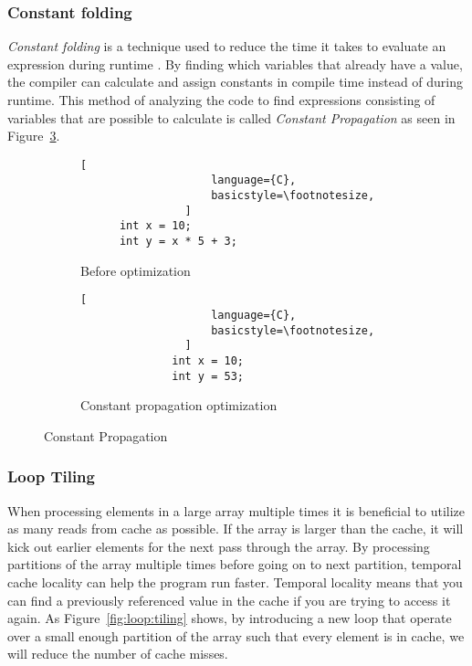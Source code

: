 \subsubsection{Constant folding}
\emph{Constant folding} is a technique used to reduce the time it takes to evaluate an expression during runtime \cite[p.~329]{muchnick1997advanced}. By finding which variables that already have a value, the compiler can calculate and assign constants in compile time instead of during runtime. This method of analyzing the code to find expressions consisting of variables that are possible to calculate is called \emph{Constant Propagation} as seen in Figure~\ref{fig:constant:propagation}.

\ifrelease
\begin{figure}[h]
    \centering
    \begin{adjustbox}{minipage=\linewidth,scale=1.0}
        \begin{subfigure}{.40\textwidth}
            \centering
            \begin{lstlisting}[
                    language={C},
                    basicstyle=\footnotesize,
                ]
      int x = 10;
      int y = x * 5 + 3;
                \end{lstlisting}
            \caption{Before optimization}
            \label{fig:propagation:sub1}
        \end{subfigure}%
        \begin{subfigure}{.50\textwidth}
            \centering
            \begin{lstlisting}[
                    language={C},
                    basicstyle=\footnotesize,
                ]
              int x = 10;
              int y = 53;
                \end{lstlisting}
            \caption{Constant propagation optimization}
            \label{fig:propagation:sub2}
        \end{subfigure}
    \end{adjustbox}
    \caption{Constant Propagation}
    \label{fig:constant:propagation}
\end{figure}
\fi

\subsubsection{Loop Tiling}
When processing elements in a large array multiple times it is beneficial to utilize as many reads from cache as possible. If the array is larger than the cache, it will kick out earlier elements for the next pass through the array. By processing partitions of the array multiple times before going on to next partition, temporal cache locality can help the program run faster. Temporal locality means that you can find a previously referenced value in the cache if you are trying to access it again. As Figure~\ref{fig:loop:tiling} shows, by introducing a new loop that operate over a small enough partition of the array such that every element is in cache, we will reduce the number of cache misses.

